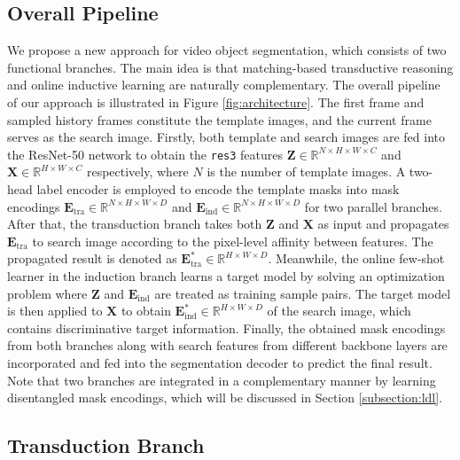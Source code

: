 \documentclass[10pt,twocolumn,letterpaper]{article}
\begin{document}
\subsection{Overall Pipeline} \label{subsection:pipeline}
We propose a new approach for video object segmentation, which consists of two functional branches. The main idea is that matching-based transductive reasoning and online inductive learning are naturally complementary.
The overall pipeline of our approach is illustrated in Figure \ref{fig:architecture}. The first frame and sampled history frames constitute the template images, and the current frame serves as the search image. Firstly, both template and search images are fed into the ResNet-50 \cite{resnet2016A} network to obtain the \texttt{res3} features $\mathbf{Z} \in \mathbb{R}^{N \times H \times W \times C}$ and $\mathbf{X} \in \mathbb{R}^{H \times W \times C}$ respectively, where $N$ is the number of template images. A two-head label encoder is employed to encode the template masks into mask encodings $\mathbf{E}_{\text{tra}} \in \mathbb{R}^{N \times H \times W \times D }$ and $\mathbf{E}_{\text{ind}} \in \mathbb{R}^{N \times H \times W \times D}$ for two parallel branches. After that, the transduction branch takes both $\mathbf{Z}$ and $\mathbf{X}$ as input and propagates $\mathbf{E}_{\text{tra}}$ to search image according to the pixel-level affinity between features. The propagated result is denoted as $\mathbf{E}_{\text{tra}}^* \in \mathbb{R}^{H \times W \times D}$. Meanwhile, the online few-shot learner in the induction branch learns a target model by solving an optimization problem where $\mathbf{Z}$ and $\mathbf{E}_{\text{ind}}$ are treated as training sample pairs. The target model is then applied to $\mathbf{X}$ to obtain $\mathbf{E}_{\text{ind}}^* \in \mathbb{R}^{H \times W \times D}$ of the search image, which contains discriminative target information. Finally, the obtained mask encodings from both branches along with search features from different backbone layers are incorporated and fed into the segmentation decoder to predict the final result. Note that two branches are integrated in a complementary manner by learning disentangled mask encodings, which will be discussed in Section \ref{subsection:ldl}.

\subsection{Transduction Branch} \label{subsection:mpb}
 
\end{document}
